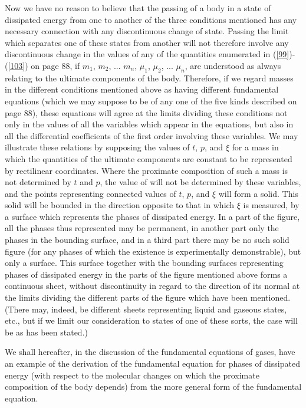 \documentclass[12pt]{article}
\begin{document}
Now we have no reason to believe that the passing of a body in a state of dissipated energy from one to another of the three conditions mentioned has any necessary connection with any discontinuous change of state. Passing the limit which separates one of these states from another will not therefore involve any discontinuous change in the values of any of the quantities enumerated in (\ref{99})-(\ref{103}) on page 88, if $m_1$, $m_2$, ... $m_n$, $\mu_1$, $\mu_2$, ... $\mu_n$, are understood as always relating to the ultimate components of the body. Therefore, if we regard masses in the different conditions mentioned above as having different fundamental equations (which we may suppose to be of any one of the five kinds described on page 88), these equations will agree at the limits dividing these conditions not only in the values of all the variables which appear in the equations, but also in all the differential coefficients of the first order involving these variables. We may illustrate these relations by supposing the values of $t$, $p$, and $\xi$ for a mass in which the quantities of the ultimate components are constant to be represented by rectilinear coordinates. Where the proximate composition of such a mass is not determined by $t$ and $p$, the value of  will not be determined by these variables, and the points representing connected values of $t$, $p$, and $\xi$ will form a solid. This solid will be bounded in the direction opposite to that in which $\xi$ is measured, by a surface which represents the phases of dissipated energy. In a part of the figure, all the phases thus represented may be permanent, in another part only the phases in the bounding surface, and in a third part there may be no such solid figure (for any phases of which the existence is experimentally demonstrable), but only a surface. This surface together with the bounding surfaces representing phases of dissipated energy in the parts of the figure mentioned above forms a continuous sheet, without discontinuity in regard to the direction of its normal at the limits dividing the different parts of the figure which have been mentioned. (There may, indeed, be different sheets representing liquid and gaseous states, etc., but if we limit our consideration to states of one of these sorts, the case will be as has been stated.)


We shall hereafter, in the discussion of the fundamental equations of gases, have an example of the derivation of the fundamental equation for phases of dissipated energy (with respect to the molecular changes on which the proximate composition of the body depends) from the more general form of the fundamental equation.
\end{document}
